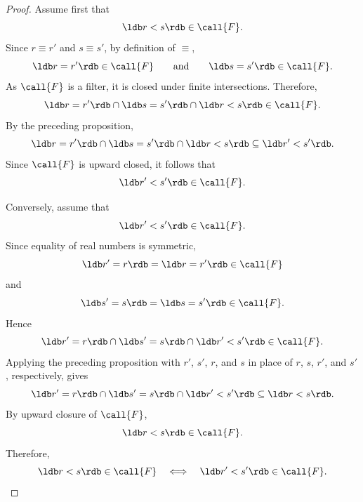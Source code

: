 \begin{proof}
    Assume first that
    \[
    \ldb r<s\rdb\in\call{F}.
    \]
    Since \(r\equiv r'\) and \(s\equiv s'\), by definition of \(\equiv\),
    \[
    \ldb r=r'\rdb\in\call{F}
    \qquad\text{and}\qquad
    \ldb s=s'\rdb\in\call{F}.
    \]
    As \(\call{F}\) is a filter, it is closed under finite intersections.
    Therefore,
    \[
    \ldb r=r'\rdb
    \cap
    \ldb s=s'\rdb
    \cap
    \ldb r<s\rdb
    \in\call{F}.
    \]
    By the preceding proposition,
    \[
    \ldb r=r'\rdb
    \cap
    \ldb s=s'\rdb
    \cap
    \ldb r<s\rdb
    \subseteq
    \ldb r'<s'\rdb.
    \]
    Since \(\call{F}\) is upward closed, it follows that
    \[
    \ldb r'<s'\rdb\in\call{F}.
    \]

    Conversely, assume that
    \[
    \ldb r'<s'\rdb\in\call{F}.
    \]
    Since equality of real numbers is symmetric,
    \[
    \ldb r'=r\rdb=\ldb r=r'\rdb\in\call{F}
    \]
    and
    \[
    \ldb s'=s\rdb=\ldb s=s'\rdb\in\call{F}.
    \]
    Hence
    \[
    \ldb r'=r\rdb
    \cap
    \ldb s'=s\rdb
    \cap
    \ldb r'<s'\rdb
    \in\call{F}.
    \]
    Applying the preceding proposition with \(r'\), \(s'\), \(r\), and
    \(s\) in place of \(r\), \(s\), \(r'\), and \(s'\), respectively, gives
    \[
    \ldb r'=r\rdb
    \cap
    \ldb s'=s\rdb
    \cap
    \ldb r'<s'\rdb
    \subseteq
    \ldb r<s\rdb.
    \]
    By upward closure of \(\call{F}\),
    \[
    \ldb r<s\rdb\in\call{F}.
    \]
    Therefore,
    \[
    \ldb r<s\rdb\in\call{F}
    \quad\Longleftrightarrow\quad
    \ldb r'<s'\rdb\in\call{F}.
    \]
\end{proof}


